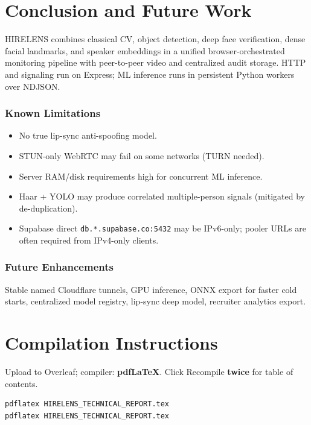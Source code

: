 \documentclass[11pt,a4paper]{report}
\begin{document}
\chapter{Conclusion and Future Work}

HIRELENS combines classical CV, object detection, deep face verification, dense facial landmarks, and speaker embeddings in a unified browser-orchestrated monitoring pipeline with peer-to-peer video and centralized audit storage. HTTP and signaling run on Express; ML inference runs in persistent Python workers over NDJSON.

\subsection{Known Limitations}
\begin{itemize}
  \item No true lip-sync anti-spoofing model.
  \item STUN-only WebRTC may fail on some networks (TURN needed).
  \item Server RAM/disk requirements high for concurrent ML inference.
  \item Haar + YOLO may produce correlated multiple-person signals (mitigated by de-duplication).
  \item Supabase direct \texttt{db.*.supabase.co:5432} may be IPv6-only; pooler URLs are often required from IPv4-only clients.
\end{itemize}

\subsection{Future Enhancements}
Stable named Cloudflare tunnels, GPU inference, ONNX export for faster cold starts, centralized model registry, lip-sync deep model, recruiter analytics export.

\appendix
\chapter{Compilation Instructions}

Upload to Overleaf; compiler: \textbf{pdfLaTeX}. Click Recompile \textbf{twice} for table of contents.

\begin{verbatim}
pdflatex HIRELENS_TECHNICAL_REPORT.tex
pdflatex HIRELENS_TECHNICAL_REPORT.tex
\end{verbatim}
\end{document}

